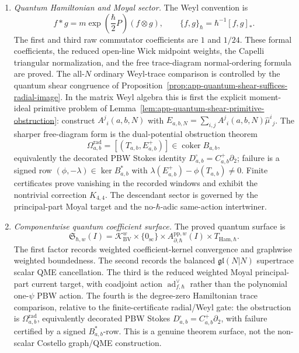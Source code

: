 \begin{enumerate}
  \item \emph{Quantum Hamiltonian and Moyal sector.}
  The Weyl convention is
  \[
    f*g=m\exp\!\left(\frac{\hbar}{2}P\right)(f\otimes g),
    \qquad
    \{f,g\}_\hbar=\hbar^{-1}[f,g]_* .
  \]
  The first and third raw commutator coefficients are \(1\) and
  \(1/24\).  These formal coefficients, the reduced open-line Wick
  midpoint weights, the Capelli triangular normalization, and the free
  trace-diagram normal-ordering formula are proved.  The all-\(N\)
  ordinary Weyl-trace comparison is controlled by the quantum shear
  congruence of
  Proposition~\ref{prop:app-quantum-shear-suffices-radial-image}.  In
  the matrix Weyl algebra this is first the explicit moment-ideal
  primitive problem of
  Lemma~\ref{lem:app-quantum-shear-primitive-obstruction}: construct
  \(A^j{}_i(a,b,N)\) with
  \(E_{a,b,N}=\sum_{i,j}A^j{}_i(a,b,N)\widehat\mu^i{}_j\).  The sharper
  free-diagram form is the dual-potential obstruction theorem
  \[
    \Omega^{\mathrm{rad}}_{a,b}
    =
    [(T_{a,b},E^+_{a,b})]\in\operatorname{coker}B_{a,b},
  \]
  equivalently the decorated PBW Stokes identity
  \(D^\square_{a,b}=C^+_{a,b}\partial_2\); failure is a signed row
  \((\phi,-\lambda)\in\ker B_{a,b}^*\) with
  \(\lambda(E^+_{a,b})-\phi(T_{a,b})\ne0\).  Finite certificates prove
  vanishing in the recorded windows and exhibit the nontrivial
  correction \(K_{4,4}\).  The descendant sector is
  governed by the principal-part Moyal target and the
  no-\(\hbar\)-adic same-action intertwiner.

  \item \emph{Componentwise quantum coefficient surface.}
  The proved quantum surface is
  \[
    \mathfrak S_{\hbar,w}(I)
      =
      \mathcal K_{\mathrm{BV}}^w
      \times\{0_{\mathrm{sc}}\}
      \times A^{\mathrm{pp},w}_{\partial,\hbar}(I)
      \times T_{\mathrm{Ham},\hbar}.
  \]
  The first factor records weighted coefficient-kernel convergence and
  graphwise weighted boundedness.  The second records the balanced
  \(\mathfrak{gl}(N|N)\) supertrace scalar QME cancellation.  The third
  is the reduced weighted Moyal principal-part current target, with
  coadjoint action \(\operatorname{ad}^{\vee}_{f,\hbar}\) rather than the
  polynomial one-\(\psi\) PBW action.  The fourth is the degree-zero
  Hamiltonian trace comparison, relative to the finite-certificate
  radial/Weyl gate: the obstruction is
  \(\Omega^{\mathrm{rad}}_{a,b}\), equivalently decorated PBW Stokes
  \(D^\square_{a,b}=C^+_{a,b}\partial_2\), with failure certified by a
  signed \(B_{a,b}^*\)-row.  This is a
  genuine theorem surface, not the non-scalar
  Costello graph/QME construction.


\end{enumerate}
